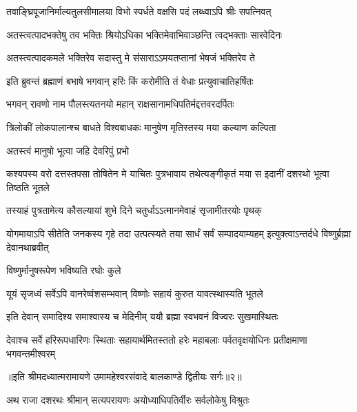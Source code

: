 \twolineshloka
{तवाङ्घ्रिपूजानिर्माल्यतुलसीमालया विभो}
{स्पर्धते वक्षसि पदं लब्ध्वाऽपि श्रीः सपत्निवत्} %

\twolineshloka
{अतस्त्वत्पादभक्तेषु तव भक्तिः श्रियोऽधिका}
{भक्तिमेवाभिवाञ्छन्ति त्वद्भक्ताः सारवेदिनः} %

\twolineshloka
{अतस्त्वत्पादकमले भक्तिरेव सदास्तु मे}
{संसाराऽऽमयतप्तानां भेषजं भक्तिरेव ते} %

\twolineshloka
{इति ब्रुवन्तं ब्रह्माणं बभाषे भगवान् हरिः}
{किं करोमीति तं वेधाः प्रत्युवाचातिहर्षितः} %

\twolineshloka
{भगवन् रावणो नाम पौलस्त्यतनयो महान्}
{राक्षसानामधिपतिर्मद्दत्तवरदर्पितः} %

\twolineshloka
{त्रिलोकीं लोकपालान्श्च बाधते विश्वबाधकः}
{मानुषेण मृतिस्तस्य मया कल्याण कल्पिता} %

\onelineshloka
{अतस्त्वं मानुषो भूत्वा जहि देवरिपुं प्रभो} %



\threelineshloka
{कश्यपस्य वरो दत्तस्तपसा तोषितेन मे}
{याचितः पुत्रभावाय तथेत्यङ्गीकृतं मया}
{स इदानीं दशरथो भूत्वा तिष्ठति भूतले} %

\twolineshloka
{तस्याहं पुत्रतामेत्य कौसल्यायां शुभे दिने}
{चतुर्धाऽऽत्मानमेवाहं सृजामीतरयोः पृथक्} %

\threelineshloka
{योगमायाऽपि सीतेति जनकस्य गृहे तदा}
{उत्पत्स्यते तया सार्धं सर्वं सम्पादयाम्यहम्}
{इत्युक्त्वाऽन्तर्दधे विष्णुर्ब्रह्मा देवानथाब्रवीत्} %


\onelineshloka
{विष्णुर्मानुषरूपेण भविष्यति रघोः कुले} %

\twolineshloka
{यूयं सृजध्वं सर्वेऽपि वानरेष्वंशसम्भवान्}
{विष्णोः सहायं कुरुत यावत्स्थास्यति भूतले} %

\twolineshloka
{इति देवान् समादिश्य समाश्वास्य च मेदिनीम्}
{ययौ ब्रह्मा स्वभवनं विज्वरः सुखमास्थितः} %

\fourlineindentedshloka
{देवाश्च सर्वे हरिरूपधारिणः}
{स्थिताः सहायार्थमितस्ततो हरेः}
{महाबलाः पर्वतवृक्षयोधिनः}
{प्रतीक्षमाणा भगवन्तमीश्वरम्} %

{॥इति श्रीमदध्यात्मरामायणे उमामहेश्वरसंवादे
बालकाण्डे द्वितीयः सर्गः॥२॥
}





\twolineshloka
{अथ राजा दशरथः श्रीमान् सत्यपरायणः}
{अयोध्याधिपतिर्वीरः सर्वलोकेषु विश्रुतः} %

